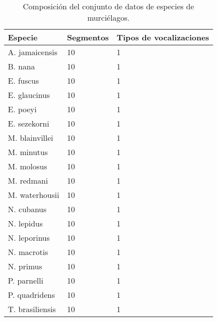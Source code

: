 \begin{table}[h]
    \centering
    \begin{tabular}{lll}
        \hline
        Especie & Segmentos & Tipos de vocalizaciones   \\ \hline
        A. jamaicensis & 10 & 1                         \\
        B. nana & 10 & 1                                \\
        E. fuscus & 10 & 1                              \\
        E. glaucinus & 10 & 1                           \\
        E. poeyi & 10 & 1                               \\
        E. sezekorni & 10 & 1                           \\
        M. blainvillei & 10 & 1                         \\
        M. minutus & 10 & 1                             \\
        M. molosus & 10 & 1                             \\
        M. redmani & 10 & 1                             \\
        M. waterhousii & 10 & 1                         \\
        N. cubanus & 10 & 1                             \\
        N. lepidus & 10 & 1                             \\
        N. leporinus & 10 & 1                           \\
        N. macrotis & 10 & 1                            \\
        N. primus & 10 & 1                              \\
        P. parnelli & 10 & 1                            \\
        P. quadridens & 10 & 1                          \\
        T. brasiliensis & 10 & 1
    \end{tabular}
    \caption{Composición del conjunto de datos de especies de murciélagos.}
    \label{table:bats-dataset}
\end{table}

